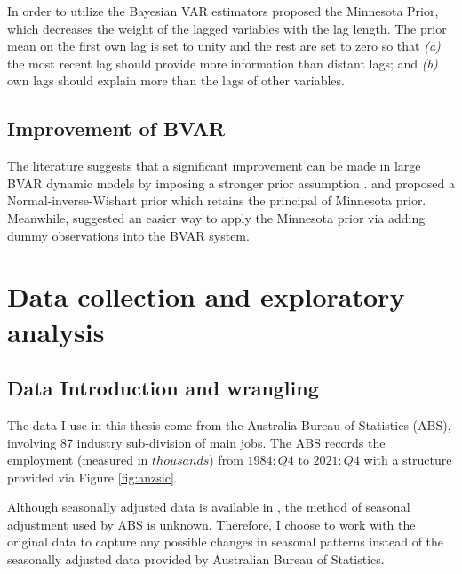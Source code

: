 \documentclass{monashthesis}
\begin{document}
In order to utilize the Bayesian VAR estimators \textcite{litterman1979} proposed the Minnesota Prior, which decreases the weight of the lagged variables with the lag length. The prior mean on the first own lag is set to unity and the rest are set to zero so that \emph{(a)} the most recent lag should provide more information than distant lags; and \emph{(b)} own lags should explain more than the lags of other variables.

\hypertarget{improvement-of-bvar}{%
\section{Improvement of BVAR}\label{improvement-of-bvar}}

The literature suggests that a significant improvement can be made in large BVAR dynamic models by imposing a stronger prior assumption \autocite{banbura2010large,litterman1986}. \textcite{robertson1999vector} and \textcite{kadiyala1997} proposed a Normal-inverse-Wishart prior which retains the principal of Minnesota prior. Meanwhile, \textcite{banbura2010large} suggested an easier way to apply the Minnesota prior via adding dummy observations into the BVAR system.

\hypertarget{data-collection-and-exploratory-analysis}{%
\chapter{Data collection and exploratory analysis}\label{data-collection-and-exploratory-analysis}}

\hypertarget{data-introduction-and-wrangling}{%
\section{Data Introduction and wrangling}\label{data-introduction-and-wrangling}}

The data I use in this thesis come from the Australia Bureau of Statistics (ABS), involving 87 industry sub-division of main jobs. The ABS records the employment (measured in \(thousands\)) from \(1984:Q4\) to \(2021:Q4\) with a structure provided via Figure \ref{fig:anzsic}.

Although seasonally adjusted data is available in \autocite{ABS2022}, the method of seasonal adjustment used by ABS is unknown. Therefore, I choose to work with the original data to capture any possible changes in seasonal patterns instead of the seasonally adjusted data provided by Australian Bureau of Statistics.
\end{document}
